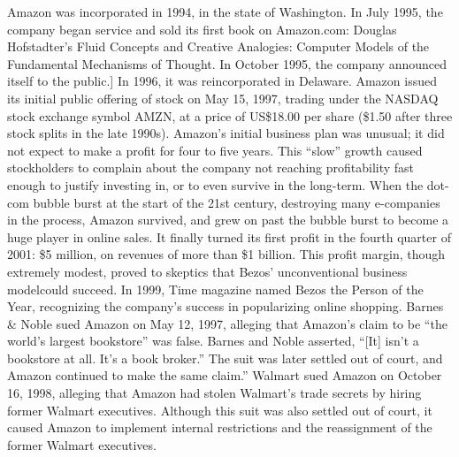 Amazon was incorporated in 1994, in the state of Washington. In July 1995, the company began service and sold its first book on Amazon.com: Douglas Hofstadter's Fluid Concepts and Creative Analogies: Computer Models of the Fundamental Mechanisms of Thought. In October 1995, the company announced itself to the public.] In 1996, it was reincorporated in Delaware. Amazon issued its initial public offering of stock on May 15, 1997, trading under the NASDAQ stock exchange symbol AMZN, at a price of US\$18.00 per share (\$1.50 after three stock splits in the late 1990s).
\newline
Amazon's initial business plan was unusual; it did not expect to make a profit for four to five years. This “slow” growth caused stockholders to complain about the company not reaching profitability fast enough to justify investing in, or to even survive in the long-term. When the dot-com bubble burst at the start of the 21st century, destroying many e-companies in the process, Amazon survived, and grew on past the bubble burst to become a huge player in online sales. It finally turned its first profit in the fourth quarter of 2001: \$5 million, on revenues of more than \$1 billion. This profit margin, though extremely modest, proved to skeptics that Bezos' unconventional business modelcould succeed. In 1999, Time magazine named Bezos the Person of the Year, recognizing the company's success in popularizing online shopping.
\newline
Barnes \& Noble sued Amazon on May 12, 1997, alleging that Amazon's claim to be “the world's largest bookstore” was false. Barnes and Noble asserted, “[It] isn't a bookstore at all. It's a book broker.” The suit was later settled out of court, and Amazon continued to make the same claim.” Walmart sued Amazon on October 16, 1998, alleging that Amazon had stolen Walmart's trade secrets by hiring former Walmart executives. Although this suit was also settled out of court, it caused Amazon to implement internal restrictions and the reassignment of the former Walmart executives.

